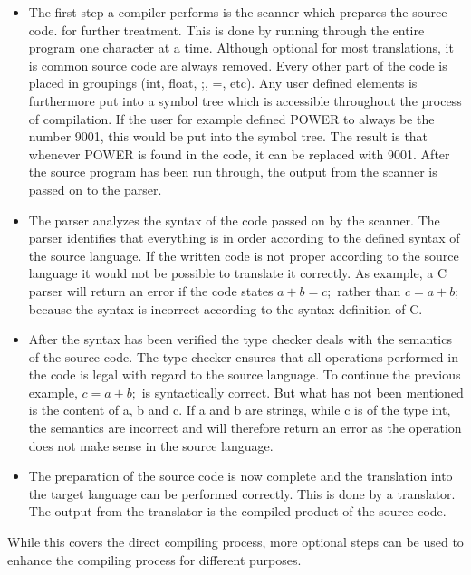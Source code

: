\begin{itemize}
	\item The first step a compiler performs is the scanner which prepares the source code. for further treatment. This is done by running through the entire program one character at a time. Although optional for most translations, it is common source code are always removed.  Every other part of the code is placed in groupings (int, float, ;, =, etc). Any user defined elements is furthermore put into a symbol tree which is accessible throughout the process of compilation. If the user for example defined POWER to always be the number 9001, this would be put into the symbol tree. The result is that whenever POWER is found in the code, it can be replaced with 9001. After the source program has been run through, the output from the scanner is passed on to the parser.
	
	\item The parser analyzes the syntax of the code passed on by the scanner. The parser identifies that everything is in order according to the defined syntax of the source language. If the written code is not proper according to the source language it would not be possible to translate it correctly. As example, a C parser will return an error if the code states $a + b = c;$ rather than $c = a + b;$ because the syntax is incorrect according to the syntax definition of C.

	\item After the syntax has been verified the type checker deals with the semantics of the source code. The type checker ensures that all operations performed in the code is legal with regard to the source language. To continue the previous example, $c = a + b;$ is syntactically correct. But what has not been mentioned is the content of a, b and c. If a and b are strings, while c is of the type int, the semantics are incorrect and will therefore return an error as the operation does not make sense in the source language.

	\item The preparation of the source code is now complete and the translation into the target language can be performed correctly. This is done by a translator. The output from the translator is the compiled product of the source code.
\end{itemize}

While this covers the direct compiling process, more optional steps can be used to enhance the compiling process for different purposes.\\

